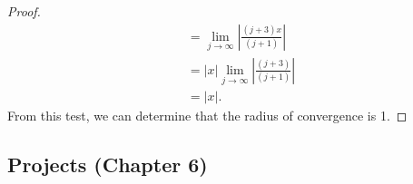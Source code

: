 \documentclass{article}
\begin{document}
\begin{enumerate}
\begin{proof}
\begin{align*}
                          & = \lim_{j\to\infty}\left|\frac{(j+3)x}{(j+1)}\right|                      \\
                          & = |x|\lim_{j\to\infty}\left|\frac{(j+3)}{(j+1)}\right|                    \\
                          & = |x|.
                  \end{align*}
                  From this test, we can determine that the radius of convergence is 1.
            \end{proof}
\end{enumerate}

\subsection*{Projects (Chapter 6)}
\end{document}
